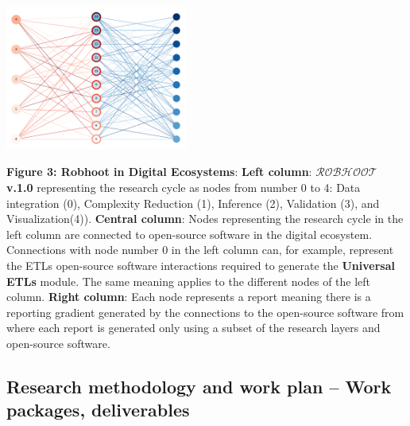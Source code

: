 \documentclass[12pt, a4paper]{article} %
\begin{document}
  \includegraphics[width=0.45\textwidth]{Figures/FigureRobhoot.pdf}
 
  {\small {\bf Figure 3: Robhoot in Digital Ecosystems}: {\bf Left
      column}: {\bf $\mathcal{ROBHOOT}$ v.1.0} representing the
    research cycle as nodes from number 0 to 4: Data integration (0),
    Complexity Reduction (1), Inference (2), Validation (3), and
    Visualization(4)). {\bf Central column}: Nodes representing the
    research cycle in the left column are connected to open-source
    software in the digital ecosystem. Connections with node number 0
    in the left column can, for example, represent the ETLs
    open-source software interactions required to generate the {\bf
      Universal ETLs} module. The same meaning applies to the
    different nodes of the left column. {\bf Right column}: Each node
    represents a report meaning there is a reporting gradient
    generated by the connections to the open-source software from
    where each report is generated only using a subset of the research
    layers and open-source software.}
  
\subsection{Research methodology and work plan – Work packages,
  deliverables}
\end{document}
